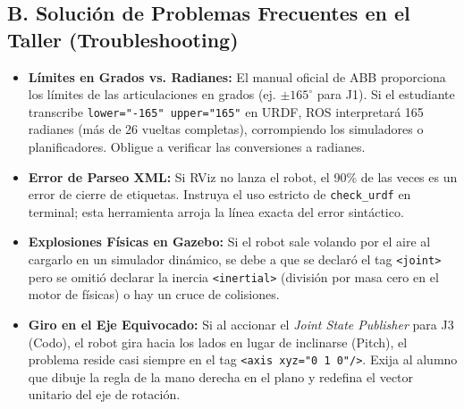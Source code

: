 \documentclass[11pt, a4paper]{article}
\begin{document}
\subsection*{B. Solución de Problemas Frecuentes en el Taller (Troubleshooting)}
\begin{itemize}
    \item \textbf{Límites en Grados vs. Radianes:} El manual oficial de ABB proporciona los límites de las articulaciones en grados (ej. $\pm 165^\circ$ para J1). Si el estudiante transcribe \texttt{lower="-165" upper="165"} en URDF, ROS interpretará 165 radianes (más de 26 vueltas completas), corrompiendo los simuladores o planificadores. Obligue a verificar las conversiones a radianes.
    \item \textbf{Error de Parseo XML:} Si RViz no lanza el robot, el 90\% de las veces es un error de cierre de etiquetas. Instruya el uso estricto de \texttt{check\_urdf} en terminal; esta herramienta arroja la línea exacta del error sintáctico.
    \item \textbf{Explosiones Físicas en Gazebo:} Si el robot sale volando por el aire al cargarlo en un simulador dinámico, se debe a que se declaró el tag \texttt{<joint>} pero se omitió declarar la inercia \texttt{<inertial>} (división por masa cero en el motor de físicas) o hay un cruce de colisiones.
    \item \textbf{Giro en el Eje Equivocado:} Si al accionar el \textit{Joint State Publisher} para J3 (Codo), el robot gira hacia los lados en lugar de inclinarse (Pitch), el problema reside casi siempre en el tag \texttt{<axis xyz="0 1 0"/>}. Exija al alumno que dibuje la regla de la mano derecha en el plano y redefina el vector unitario del eje de rotación.
\end{itemize}
\end{document}
